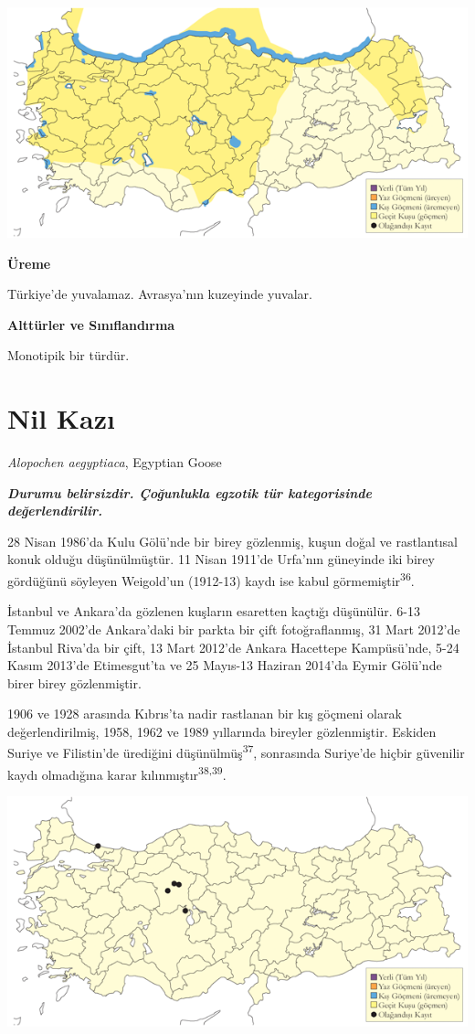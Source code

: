 \documentclass[
  letterpaper,
  DIV=11,
  numbers=noendperiod]{scrreprt}
\begin{document}
\includegraphics{images/harita_Page_010.png}

\textbf{Üreme}

Türkiye'de yuvalamaz. Avrasya'nın kuzeyinde yuvalar.

\textbf{Alttürler ve Sınıflandırma}

Monotipik bir türdür.

\section{Nil Kazı}\label{nil-kazux131}

\emph{Alopochen aegyptiaca}, Egyptian Goose

\textbf{\emph{Durumu belirsizdir. Çoğunlukla egzotik tür kategorisinde
değerlendirilir.}}

28 Nisan 1986'da Kulu Gölü'nde bir birey gözlenmiş, kuşun doğal ve
rastlantısal konuk olduğu düşünülmüştür. 11 Nisan 1911'de Urfa'nın
güneyinde iki birey gördüğünü söyleyen Weigold'un (1912-13) kaydı ise
kabul görmemiştir\textsuperscript{36}.

İstanbul ve Ankara'da gözlenen kuşların esaretten kaçtığı düşünülür.
6-13 Temmuz 2002'de Ankara'daki bir parkta bir çift fotoğraflanmış, 31
Mart 2012'de İstanbul Riva'da bir çift, 13 Mart 2012'de Ankara Hacettepe
Kampüsü'nde, 5-24 Kasım 2013'de Etimesgut'ta ve 25 Mayıs-13 Haziran
2014'da Eymir Gölü'nde birer birey gözlenmiştir.

1906 ve 1928 arasında Kıbrıs'ta nadir rastlanan bir kış göçmeni olarak
değerlendirilmiş, 1958, 1962 ve 1989 yıllarında bireyler gözlenmiştir.
Eskiden Suriye ve Filistin'de ürediğini düşünülmüş\textsuperscript{37},
sonrasında Suriye'de hiçbir güvenilir kaydı olmadığına karar
kılınmıştır\textsuperscript{38,39}.

\includegraphics{images/harita_Page_011.png}
\end{document}

